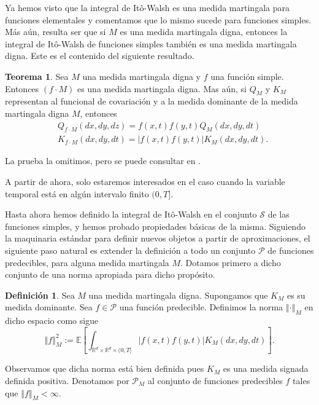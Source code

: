 \documentclass[letterpaper,twoside,12pt]{book}
\newcommand{\R}{\mathbb{R}}
\newcommand{\E}{\mathbb{E}}
\newcommand{\1}{\mathds{1}}
\newcommand{\abs}[1]{\left\lvert #1 \right\rvert}
\newcommand{\norm}[1]{\left\Vert #1 \right\Vert}
\theoremstyle{definition}
\newtheorem{dfn}{Definición}
\theoremstyle{definition}
\newtheorem{teo}{Teorema}
\theoremstyle{remark}
\theoremstyle{definition}
\theoremstyle{definition}
\theoremstyle{definition}
\theoremstyle{definition}
\theoremstyle{definition}
\begin{document}
Ya hemos visto que la integral de Itô-Walsh es una medida martingala para funciones elementales y comentamos que lo mismo sucede para funciones simples. Más aún, resulta ser que si $M$ es una medida martingala digna, entonces la integral de Itô-Walsh de funciones simples también es una medida martingala digna. Este es el contenido del siguiente resultado.

\begin{teo}\label{propiedadesintegralwalsh}
Sea $M$ una medida martingala digna y $f$ una función simple. Entonces $(f\cdot M)$ es una medida martingala digna. 
Mas aún, si $Q_M$ y $K_M$ representan al funcional de covariación y a la medida dominante de la medida martingala digna $M$, entonces 
\begin{align*}
   &Q_{f\cdot M}(dx,  dy,  dz)=f(x,t)f(y,t)Q_M(dx,  dy,  dt)\\
   &K_{f\cdot M}(dx, dy,  dt)=\abs{f(x,t)f(y,t)}K_M(dx,  dy,  dt). 
\end{align*}
\end{teo}
La prueba la omitimos, pero se puede consultar en \cite[proposición 5.23]{Khoshnevisan2009}.

A partir de ahora, solo estaremos interesados en el caso cuando la variable temporal está en algún intervalo finito $(0,T]$.

Hasta ahora hemos definido la integral de Itô-Walsh en el conjunto $\mathscr{S}$ de las funciones simples, y hemos probado propiedades básicas de la misma. Siguiendo la maquinaria estándar para definir nuevos objetos a partir de aproximaciones, el siguiente paso natural es extender la definición a todo un conjunto $\mathscr{P}$ de funciones predecibles, para alguna medida martingala $M$. Dotamos primero a dicho conjunto de una norma apropiada para dicho propósito.
\begin{dfn} 
Sea $M$ una medida martingala digna. Supongamos que $K_M$ es su medida dominante. Sea $f\in \mathscr{P}$ una función predecible. Definimos la norma $\norm{\cdot}_M$ en dicho espacio como sigue 
\[
   \norm{f}_M^2:=\E\left[\int_{\R^{d}\times\R^{d}\times (0,T]} \abs{f(x,t)f(y,t)}K_M(dx, dy, dt)\right].
\]
\end{dfn}
Observamos que dicha norma está bien definida pues $K_M$ es una medida signada definida positiva. Denotamos por $\mathscr{P}_M$ al conjunto de funciones predecibles $f$ tales que $\norm{f}_M<\infty$.
\end{document}

